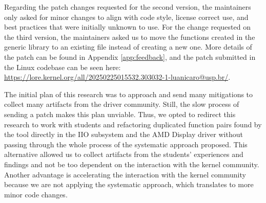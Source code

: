 Regarding the patch changes requested for the second version, the maintainers only asked 
for minor changes to align with code style, license correct use, and best practices that 
were initially unknown to use. For the change requested on the third version, the maintainers 
asked us to move the functions created in the generic library to an existing file instead of 
creating a new one. More details of the patch can be found in Appendix \ref{app:feedback}, 
and the patch submitted in the Linux codebase can be seen here:
\url{https://lore.kernel.org/all/20250225015532.303032-1-luanicaro@usp.br/}.

The initial plan of this research was to approach and send many mitigations to collect 
many artifacts from the driver community. Still, the slow process of sending a patch 
makes this plan unviable. Thus, we opted to redirect this research to work with students 
and refactoring duplicated function pairs found by the tool directly in the IIO subsystem and the 
AMD Display driver without passing through the whole process of the systematic approach 
proposed. This alternative allowed us to collect artifacts from the students' experiences 
and findings and not be too dependent on the interaction with the kernel community. 
Another advantage is accelerating the interaction with the kernel community because we are 
not applying the systematic approach, which translates to more minor code changes.
